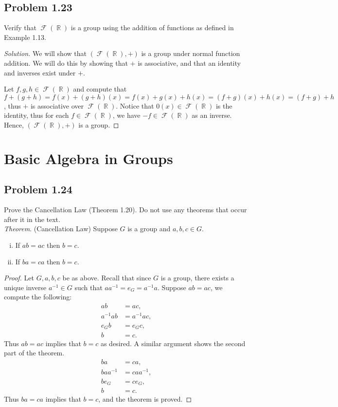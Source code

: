 \documentclass{amsbook}
\DeclareMathOperator{\R}{\mathbb{R}}
\DeclareMathOperator{\func}{\mathscr{F}}
\begin{document}
			\subsection*{Problem 1.23}
			\label{sub:problem_1_23}
			Verify that $\func(\R)$ is a group using the addition of functions as defined in Example 1.13.
			\begin{proof}[Solution] We will show that $(\func(\R), +)$ is a group under normal function addition.
			We will do this by showing that $+$ is associative, and that an identity and inverses exist under $+$.

			Let $f,g,h \in \func(\R)$ and compute that $f+(g+h) = f(x) + (g + h)(x) = f(x) + g(x) + h(x) = (f + g)(x) +h(x) = (f + g) + h$, thus $+$ is associative over $\func(\R)$.
			Notice that $0(x) \in \func(\R)$ is the identity, thus for each $f \in \func(\R)$, we have $-f \in \func(\R)$ as an inverse.
			Hence, $(\func(\R), +)$ is a group.
			\end{proof}

		\section{Basic Algebra in Groups}
		\label{sec:basic_algebra_in_groups}
			\subsection*{Problem 1.24}
			\label{sub:problem_1_24}
			Prove the Cancellation Law (Theorem 1.20). 
			Do not use any theorems that occur after it in the text. \\

			\noindent\textit{Theorem}. (Cancellation Law) Suppose $G$ is a group and $a,b,c \in G$.
			\begin{enumerate}[(i)]
				\item If $ab = ac$ then $b = c$.
				\item If $ba = ca$ then $b = c$.
			\end{enumerate}
			
			\begin{proof} Let $G, a,b,c$ be as above.
			Recall that since $G$ is a group, there exists a unique inverse $a^{-1} \in G$ such that $aa^{-1} = e_{G} = a^{-1}a$.
			Suppose $ab = ac$, we compute the following:
				\begin{align*}
				ab &= ac, \\
				a^{-1}ab &= a^{-1}ac, \\
				e_{G}b &= e_{G}c, \\
				b &= c.
				\end{align*}
			Thus $ab = ac$ implies that $b=c$ as desired.
			A similar argument shows the second part of the theorem.
				\begin{align*}
				ba &= ca, \\
				baa^{-1} &= caa^{-1}, \\
				be_{G} &= ce_{G}, \\
				b &=  c.
				\end{align*}
			Thus $ba = ca$ implies that $b=c$, and the theorem is proved.
			\end{proof}
\end{document}
